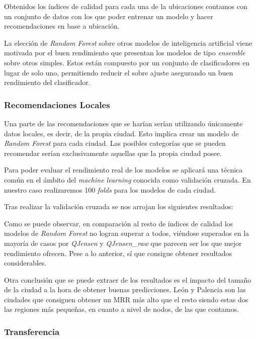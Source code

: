 Obtenidos los índices de calidad para cada una de la ubicaciones contamos con un conjunto de datos con los que poder entrenar un modelo y hacer recomendaciones en base a ubicación.

La elección de \textit{Random Forest} sobre otros modelos de inteligencia artificial viene motivada por el buen rendimiento que presentan los modelos de tipo \textit{ensemble} sobre otros simples. Estos están compuesto por un conjunto de clasificadores en lugar de solo uno, permitiendo reducir el sobre ajuste asegurando un buen rendimiento del clasificador.

\subsubsection{Recomendaciones Locales}

Una parte de las recomendaciones que se harían serían utilizando únicamente datos locales, es decir, de la propia ciudad. Esto implica crear un modelo de \textit{Random Forest} para cada ciudad. Las posibles categorías que se pueden recomendar serían exclusivamente aquellas que la propia ciudad posee.

Para poder evaluar el rendimiento real de los modelos se aplicará una técnica común en el ámbito del \textit{machine learning} conocida como validación cruzada. En nuestro caso realizaremos 100 \textit{folds} para los modelos de cada ciudad.

Tras realizar la validación cruzada se nos arrojan los siguientes resultados:



Como se puede observar, en comparación al resto de índices de calidad los modelos de \textit{Random Forest} no logran superar a todos, viéndose superados en la mayoría de casos por \textit{QJensen} y \textit{QJensen\_raw} que parecen ser los que mejor rendimiento ofrecen. Pese a lo anterior, sí que consigue obtener resultados considerables.

Otra conclusión que se puede extraer de los resultados es el impacto del tamaño de la ciudad a la hora de obtener buenas predicciones. León y Palencia son las ciudades que consiguen obtener un MRR más alto que el resto siendo estas dos las regiones más pequeñas, en cuanto a nivel de nodos, de las que contamos.
\subsubsection{Transferencia}

